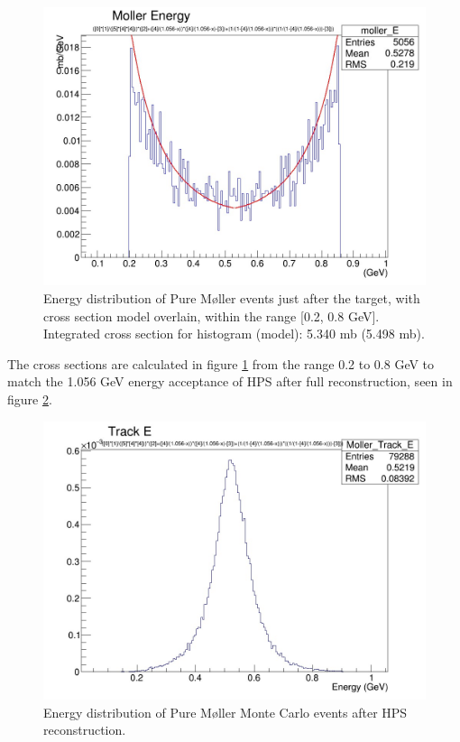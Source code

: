 \documentclass{article}
\begin{document}
\begin{figure}[H]
  	\includegraphics[width=\linewidth]{MollerPlots/MollerXS_acceptance.jpg}
  	\caption{Energy distribution of Pure M\o ller events just after the target, with cross section model overlain, within the range [0.2, 0.8 GeV]. Integrated cross section for histogram (model): 5.340 mb (5.498 mb).}
  	\label{fig:XSAcceptance}
	\end{figure}

The cross sections are calculated in figure \ref{fig:XSAcceptance} from the range 0.2 to 0.8 GeV to match the 1.056 GeV energy acceptance of HPS after full reconstruction, seen in figure \ref{fig:energyRecon}.

\begin{figure}[H]
  	\includegraphics[width=\linewidth]{MollerPlots/MollerXS_Recon.jpg}
  	\caption{Energy distribution of Pure M\o ller Monte Carlo events after HPS reconstruction.}
  	\label{fig:energyRecon}
	\end{figure}
\end{document}
